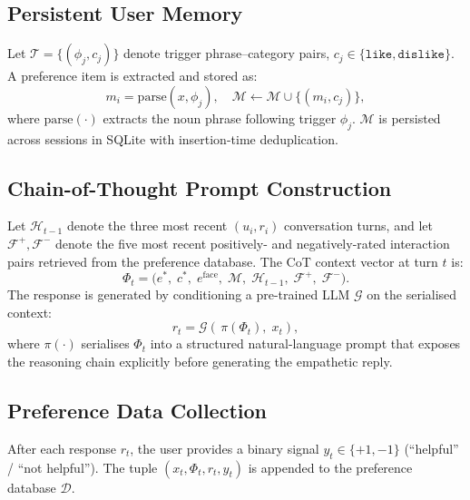 \documentclass[sigconf, review=true]{acmart}
\begin{document}
\subsection{Persistent User Memory}

Let $\mathcal{T}{=}\{(\phi_j, c_j)\}$ denote trigger
phrase--category pairs, $c_j \in \{\texttt{like},
\texttt{dislike}\}$.
A preference item is extracted and stored as:
\begin{equation}
    m_i = \text{parse}(x, \phi_j), \quad
    \mathcal{M} \leftarrow \mathcal{M} \cup \{(m_i, c_j)\},
    \label{eq:memory}
\end{equation}
where $\text{parse}(\cdot)$ extracts the noun phrase following
trigger $\phi_j$.
$\mathcal{M}$ is persisted across sessions in SQLite with
insertion-time deduplication.

\subsection{Chain-of-Thought Prompt Construction}

Let $\mathcal{H}_{t-1}$ denote the three most recent
$(u_i, r_i)$ conversation turns, and let
$\mathcal{F}^+, \mathcal{F}^-$ denote the five most recent
positively- and negatively-rated interaction pairs retrieved
from the preference database.
The CoT context vector at turn $t$ is:
\begin{equation}
    \Phi_t = \bigl(e^*,\; c^*,\; e^{\text{face}},
               \; \mathcal{M},\; \mathcal{H}_{t-1},\;
               \mathcal{F}^+,\; \mathcal{F}^-\bigr).
    \label{eq:cot_context}
\end{equation}
The response is generated by conditioning a pre-trained LLM
$\mathcal{G}$ on the serialised context:
\begin{equation}
    r_t = \mathcal{G}\!\left(\, \pi(\Phi_t),\; x_t \right),
    \label{eq:generation}
\end{equation}
where $\pi(\cdot)$ serialises $\Phi_t$ into a structured
natural-language prompt that exposes the reasoning chain
explicitly before generating the empathetic reply.

\subsection{Preference Data Collection}

After each response $r_t$, the user provides a binary signal
$y_t \in \{+1, -1\}$ (``helpful'' / ``not helpful'').
The tuple $(x_t, \Phi_t, r_t, y_t)$ is appended to the
preference database $\mathcal{D}$.
\end{document}
